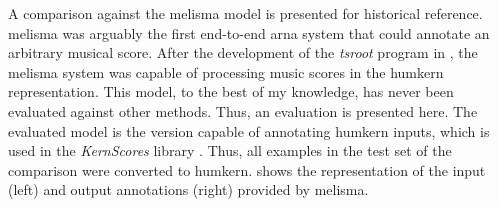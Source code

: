 
A comparison against the \gls{melisma} model is presented
for historical reference. \gls{melisma} was arguably the
first end-to-end \gls{arna} system that could annotate an
arbitrary musical score. After the development of the
\emph{tsroot} program in \textcite{sapp2009tsroot}, the
\gls{melisma} system was capable of processing music scores
in the \gls{humkern} representation. This model, to the best
of my knowledge, has never been evaluated against other
methods. Thus, an evaluation is presented here. The
evaluated model is the version capable of annotating
\gls{humkern} inputs, which is used in the \emph{KernScores}
library \parencite{sapp2005online}. Thus, all examples in
the test set of the comparison were converted to
\gls{humkern}. 
shows the representation of the input (left) and output
annotations (right) provided by \gls{melisma}.

